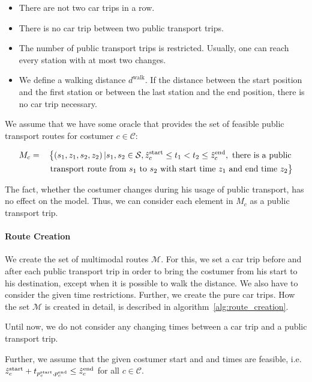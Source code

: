\begin{itemize}
	\item{There are not two car trips in a row.}
	\item{There is no car trip between two public transport trips.}
	\item{The number of public transport trips is restricted. Usually, one can reach every station with at most two changes.}
	\item{We define a walking distance $d^{\operatorname{walk}}$. If the distance between the start position and the first station or between the last station and the end position, there is no car trip necessary.}
\end{itemize}

We assume that we have some oracle that provides the set of feasible public transport routes for costumer $c\in\mathcal{C}$:

\begin{align*}
	M_c & = && \left\{\left(s_1,z_1,s_2,z_2\right)|s_1,s_2\in\mathcal{S}, \zstarto_c\leq t_1 < t_2 \leq \zendo_c, \text{ there is a public} \right. \\
	&&& \left.\vphantom{\zstarto}\text{transport route from $s_1$ to $s_2$ with start time $z_1$ and end time $z_2$}\right\}
\end{align*}

The fact, whether the costumer changes during his usage of public transport, has no effect on the model. Thus, we can consider each element in $M_c$ as a public transport trip.

\paragraph{Route Creation} \parfill

We create the set of multimodal routes $\mathcal{M}$. For this, we set a car trip before and after each public transport trip in order to bring the costumer from his start to his destination, except when it is possible to walk the distance. We also have to consider the given time restrictions. Further, we create the pure car trips. How the set $\mathcal{M}$ is created in detail, is described in algorithm~\ref{alg:route_creation}.

Until now, we do not consider any changing times between a car trip and a public transport trip.

Further, we assume that the given costumer start and and times are feasible, i.e. $\hat{z}^{\operatorname{start}}_c+t_{p^{\operatorname{start}}_c,p^{\operatorname{end}}_c}\leq\hat{z}^{\operatorname{end}}_c$ for all $c\in\mathcal{C}$.


